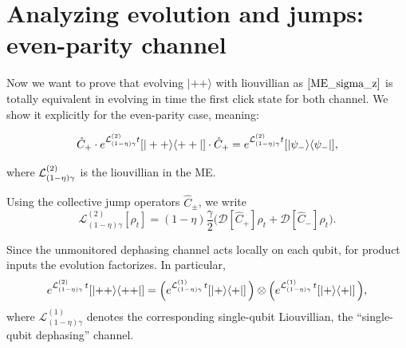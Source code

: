 \section*{Analyzing evolution and jumps: even-parity channel}
\label{app:bridge_proof}

Now we want to prove that evolving $|++\rangle$ with liouvillian as $\eqref{ME_sigma_z}$ is totally equivalent in evolving in time the first click state for both channel. We show it explicitly for the even-parity case, meaning:

\begin{equation}
	\hat C_+ \cdot e^{\mathcal{L}_{(1-\eta)\gamma}^{(2)} t} [|++\rangle \langle ++|] \cdot \hat C_+ = e^{\mathcal{L}_{(1-\eta)\gamma}^{(2)} t} [|\psi_- \rangle \langle \psi_-|],
	\label{Bridge_proof}
\end{equation}

where $ \mathcal{L}_{(1-\eta)\gamma}^{(2)}$ is the liouvillian in the ME.

Using the collective jump operators $\hat C_\pm$, we write
\begin{equation}
	\mathcal{L}^{(2)}_{(1-\eta)\gamma}[\rho_t]
	=
	(1-\eta)\frac{\gamma}{2}
	\Big(
	\mathcal{D}[\hat{C}_+]\rho_t
	+
	\mathcal{D}[\hat{C}_-]\rho_t
	\Big).
	\label{eq:Liouv_unmonitored_collective}
\end{equation}

Since the unmonitored dephasing channel acts locally on each qubit, for product inputs
the evolution factorizes. In particular,
\begin{equation}
	e^{\mathcal{L}^{(2)}_{(1-\eta)\gamma}\,t}\!\left[\ket{++}\!\bra{++}\right]
	=
	\Big(
	e^{\mathcal{L}^{(1)}_{(1-\eta)\gamma}\,t}\!\left[\ket{+}\!\bra{+}\right]
	\Big)
	\otimes
	\Big(
	e^{\mathcal{L}^{(1)}_{(1-\eta)\gamma}\,t}\!\left[\ket{+}\!\bra{+}\right]
	\Big),
	\label{eq:factorization_single_qubit}
\end{equation}
where $\mathcal{L}^{(1)}_{(1-\eta)\gamma}$ denotes the corresponding single-qubit Liouvillian, the ``single-qubit dephasing'' channel.

